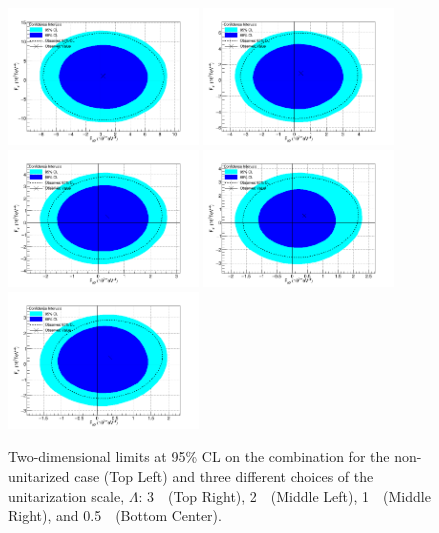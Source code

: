 \begin{figure}[h!]
\begin{center}

\includegraphics[width=0.45\textwidth]{figures/combination/Comb500-Lim.png}
\includegraphics[width=0.45\textwidth]{figures/combination/Comb100-Lim.png}\\
\includegraphics[width=0.45\textwidth]{figures/combination/Comb200-Lim.png}
\includegraphics[width=0.45\textwidth]{figures/combination/Comb300-Lim.png}\\
\includegraphics[width=0.45\textwidth]{figures/combination/CombUnit-Lim.png}
\end{center}
\caption{Two-dimensional limits at 95\% CL on the combination for the non-unitarized case (Top Left)
and three different choices of the unitarization scale, $\Lambda$:
3~\TeV~(Top Right), 2~\TeV~(Middle Left), 1~\TeV~(Middle Right), and 0.5~\TeV~(Bottom Center).}

 \label{fig:aqgc_combined_2d}
 \end{figure}



